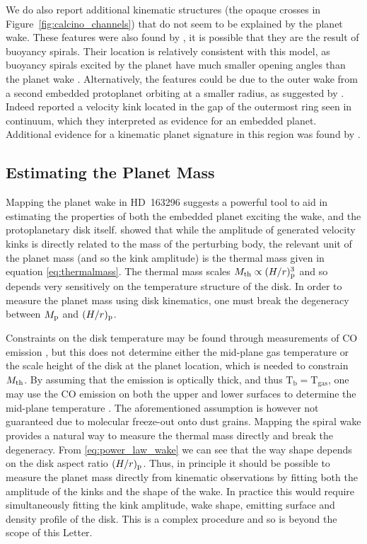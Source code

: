 We do also report additional kinematic structures (the opaque crosses in Figure~\ref{fig:calcino_channels}) that do not seem to be explained by the planet wake.
These features were also found by \citet{teague2021}, it is possible that they are the result of buoyancy spirals.
Their location is relatively consistent with this model, as buoyancy spirals excited by the planet have much smaller opening angles than the planet wake \citep{bae2021}.
Alternatively, the features could be due to the outer wake from a second embedded protoplanet orbiting at a smaller radius, as suggested by \citet{teague2018}.
Indeed \citep{pinte2020} reported a velocity kink located in the gap of the outermost ring seen in continuum, which they interpreted as evidence for an embedded planet.
Additional evidence for a kinematic planet signature in this region was found by \citet{teague2021}. 

\subsection{Estimating the Planet Mass}

Mapping the planet wake in HD~163296 suggests a powerful tool to aid in estimating the properties of both the embedded planet exciting the wake, and the protoplanetary disk itself.
 showed that while the amplitude of generated velocity kinks is directly related to the mass of the perturbing body, the relevant unit of the planet mass (and so the kink amplitude) is the thermal mass \citep{goodman2001} given in equation \ref{eq:thermalmass}.
The thermal mass scales $M_{\rm th} \propto (H/r)_{\rm p}^3$ and so depends very sensitively on the temperature structure of the disk.
In order to measure the planet mass using disk kinematics, one must break the degeneracy between $M_{\rm p}$ and $(H/r)_{\rm p}$.

Constraints on the disk temperature may be found through measurements of CO emission \citep[e.g.][]{pinte2018},
but this does not determine either the mid-plane gas temperature or the scale height of the disk at the planet location, which is needed to constrain $M_{\rm th}$.
By assuming that the emission is optically thick, and thus $\mathrm{T_b}=\mathrm{T_{gas}}$, one may use the CO emission on both the upper and lower surfaces to determine the mid-plane temperature \citep{dullemond2020}.
The aforementioned assumption is however not guaranteed due to molecular freeze-out onto dust grains.
Mapping the spiral wake provides a natural way to measure the thermal mass directly and break the degeneracy.
From \ref{eq:power_law_wake} we can see that the way shape depends on the disk aspect ratio $(H/r)_{\rm p}$.
Thus, in principle it should be possible to measure the planet mass directly from kinematic observations by fitting both the amplitude of the kinks and the shape of the wake.
In practice this would require simultaneously fitting the kink amplitude, wake shape, emitting surface and density profile of the disk.
This is a complex procedure and so is beyond the scope of this Letter.
%
